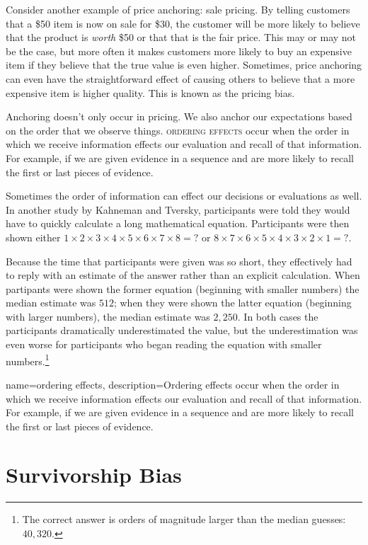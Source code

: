 Consider another example of price anchoring: sale pricing. By telling customers that a \$50 item is now on sale for \$30, the customer will be more likely to believe that the product is \emph{worth} \$50 or that that is the fair price. This may or may not be the case, but more often it makes customers more likely to buy an expensive item if they believe that the true value is even higher. Sometimes, price anchoring can even have the straightforward effect of causing others to believe that a more expensive item is higher quality. This is known as the pricing bias.

Anchoring doesn't only occur in pricing. We also anchor our expectations based on the order that we observe things. \textsc{\Gls{ordering effects}} occur when the order in which we receive information effects our evaluation and recall of that information. For example, if we are given evidence in a sequence and are more likely to recall the first or last pieces of evidence. 

Sometimes the order of information can effect our decisions or evaluations as well. In another study by Kahneman and Tversky, participants were told they would have to quickly calculate a long mathematical equation. Participants were then shown either $1\times 2\times 3\times 4\times 5\times 6\times 7\times 8 = ?$ or  $ 8\times 7\times 6\times 5\times 4\times 3\times 2\times 1 = ?$. 

Because the time that participants were given was so short, they effectively had to reply with an estimate of the answer rather than an explicit calculation. When partipants were shown the former equation (beginning with smaller numbers) the median estimate was $512$; when they were shown the latter equation (beginning with larger numbers), the median estimate was $2,250$. In both cases the participants dramatically underestimated the value, but the underestimation was even worse for participants who began reading the equation with smaller numbers.\footnote{The correct answer is orders of magnitude larger than the median guesses: $40,320$.}

{
name=ordering effects,
description={Ordering effects occur when the order in which we receive information effects our evaluation and recall of that information. For example, if we are given evidence in a sequence and are more likely to recall the first or last pieces of evidence.}
}

\section{Survivorship Bias}


